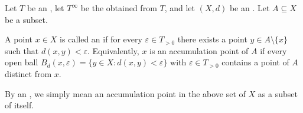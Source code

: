 \begin{definition} \label{definition:accumulation_point_in_an_extended_metric_space_valued_in_ordered_commutative_monoid_with_adjoined_infinity}
    Let $T$ be an , let $T^\infty$ be the  obtained from $T$, and let $(X,d)$ be an . Let $A \subseteq X$ be a subset.

    A point $x \in X$ is called an  if for every $\varepsilon \in T_{>0}$ there exists a point $y \in A \setminus \{x\}$ such that $d(x,y) < \varepsilon$.
    Equivalently, $x$ is an accumulation point of $A$ if every open ball $B_d(x,\varepsilon) = \{y \in X : d(x,y) < \varepsilon\}$ with $\varepsilon \in T_{>0}$ contains a point of $A$ distinct from $x$.

    By an , we simply mean an accumulation point in the above set of $X$ as a subset of itself.
\end{definition}